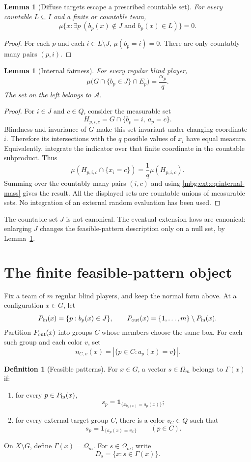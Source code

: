 \documentclass[11pt,letterpaper]{article}
\newtheorem{lemma}[theorem]{Lemma}
\theoremstyle{definition}
\newtheorem{definition}[theorem]{Definition}
\newcommand{\ind}{\mathbf 1}
\newcommand{\A}{\mathcal A}
\begin{document}
\begin{lemma}[Diffuse targets escape a prescribed countable set]
\label{mbg:ext:lem:escape}
For every countable $L\subseteq I$ and a finite or countable team,
\[
\mu\{x:\exists p\ (b_p(x)\notin J\text{ and }b_p(x)\in L)\}=0.
\]
\end{lemma}
\begin{proof}
For each $p$ and each $i\in L\setminus J$, $\mu(b_p=i)=0$. There are only countably many pairs $(p,i)$.
\end{proof}

\begin{lemma}[Internal fairness]
\label{mbg:ext:lem:fair}
For every regular blind player,
\[
\mu\bigl(G\cap\{b_p\in J\}\cap E_p\bigr)=\frac{\alpha_p}{q}.
\]
The set on the left belongs to $\A$.
\end{lemma}
\begin{proof}
For $i\in J$ and $c\in Q$, consider the measurable set
\[
H_{p,i,c}=G\cap\{b_p=i,\ a_p=c\}.
\]
Blindness and invariance of $G$ make this set invariant under changing coordinate $i$. Therefore its intersections with the $q$ possible values of $x_i$ have equal measure. Equivalently, integrate the indicator over that finite coordinate in the countable subproduct. Thus
\[
\mu(H_{p,i,c}\cap\{x_i=c\})=\frac1q\mu(H_{p,i,c}).
\]
Summing over the countably many pairs $(i,c)$ and using \eqref{mbg:ext:eq:internal-mass} gives the result. All the displayed sets are countable unions of measurable sets. No integration of an external random evaluation has been used.
\end{proof}

The countable set $J$ is not canonical. The eventual extension laws are canonical: enlarging $J$ changes the feasible-pattern description only on a null set, by Lemma~\ref{mbg:ext:lem:escape}.

\section{The finite feasible-pattern object}
\label{mbg:ext:sec:feasible}

Fix a team of $m$ regular blind players, and keep the normal form above. At a configuration $x\in G$, let
\[
P_{\rm in}(x)=\{p:b_p(x)\in J\},\qquad
P_{\rm out}(x)=\{1,\ldots,m\}\setminus P_{\rm in}(x).
\]
Partition $P_{\rm out}(x)$ into groups $C$ whose members choose the same box. For each such group and each color $v$, set
\[
n_{C,v}(x)=|\{p\in C:a_p(x)=v\}|.
\]

\begin{definition}[Feasible patterns]
\label{mbg:ext:def:gamma}
For $x\in G$, a vector $s\in\Omega_m$ belongs to $\Gamma(x)$ if:
\begin{enumerate}[label=(\roman*)]
\item for every $p\in P_{\rm in}(x)$,
\[
s_p=\ind_{\{x_{b_p(x)}=a_p(x)\}};
\]
\item for every external target group $C$, there is a color $v_C\in Q$ such that
\[
s_p=\ind_{\{a_p(x)=v_C\}}\qquad(p\in C).
\]
\end{enumerate}
On $X\setminus G$, define $\Gamma(x)=\Omega_m$. For $s\in\Omega_m$, write
\[
D_s=\{x:s\in\Gamma(x)\}.
\]
\end{definition}
\end{document}
